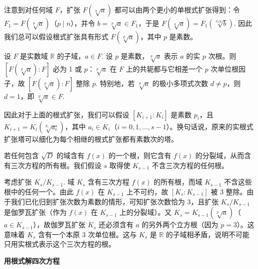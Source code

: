 注意到对任何域 \(F\)，扩张 \(F(\sqrt[n]{a})\) 都可以由两个更小的单根式扩张得到：令 \(F_1 = F(\sqrt[p]{a})\)（\(p \mid n\)），并令 \(b = \sqrt[p]{a} \in F_1\)，于是 \(F(\sqrt[n]{a}) = F_1(\sqrt[n/p]{b})\). 因此我们总可以假设根式扩张具有形式 \(F(\sqrt[p]{a})\)，其中 \(p\) 是素数。

设 \(F\) 是实数域 \(\mathbb{R}\) 的子域，\(a \in F\). 设 \(p\) 是素数，\(\sqrt[p]{a}\) 表示 \(a\) 的实 \(p\) 次根。则 \([F(\sqrt[p]{a}):F]\) 必为 1 或 \(p\)：\(\sqrt[p]{a}\) 在 \(F\) 上的共轭都与它相差一个 \(p\) 次单位根因子，故 \([F(\sqrt[p]{a}):F]\) 整除 \(p\). 特别地，若 \(\sqrt[p]{a}\) 的极小多项式次数 \(d \neq p\)，则 \(d = 1\)，即 \(\sqrt[p]{a} \in F\).

因此对于上面的根式扩张，我们可以假设 \([K_{i+1}:K_i]\) 是素数 \(p_i\)，且 \(K_{i+1} = K_i(\sqrt[p_i]{a_i})\)，其中 \(a_i \in K_i\)（\(i = 0, 1, \ldots, s-1\)）。换句话说，原来的实根式扩张塔可以细化为每个相继的根式扩张都有素数次的塔。

若任何包含 \(\sqrt{D}\) 的域含有 \(f(x)\) 的一个根，则它含有 \(f(x)\) 的分裂域，从而含有三次方程的所有根。我们假设 \(s\) 取得使 \(K_{s-1}\) 不含三次方程的任何根。

考虑扩张 \(K_s/K_{s-1}\). 域 \(K_s\) 含有三次方程 \(f(x)\) 的所有根，而域 \(K_{s-1}\) 不含这些根中的任何一个。由此 \(f(x)\) 在 \(K_{s-1}\) 上不可约，故 \([K_s:K_{s-1}]\) 被 3 整除。由于我们已化归到扩张次数为素数的情形，可知扩张次数恰为 3，且扩张 \(K_s/K_{s-1}\) 是伽罗瓦扩张（作为 \(f(x)\) 在 \(K_{s-1}\) 上的分裂域）。又 \(K_s = K_{s-1}(\sqrt[p]{a})\)（\(a \in K_{s-1}\)），故伽罗瓦扩张 \(K_s\) 还必须含有 \(a\) 的另外两个立方根（因为 \(p = 3\)）。这意味着 \(K_s\) 含有一个本原 3 次单位根。这与 \(K_s\) 是 \(\mathbb{R}\) 的子域相矛盾，说明不可能只用实根式表示这个三次方程的根。

\noindent\textbf{用根式解四次方程}

